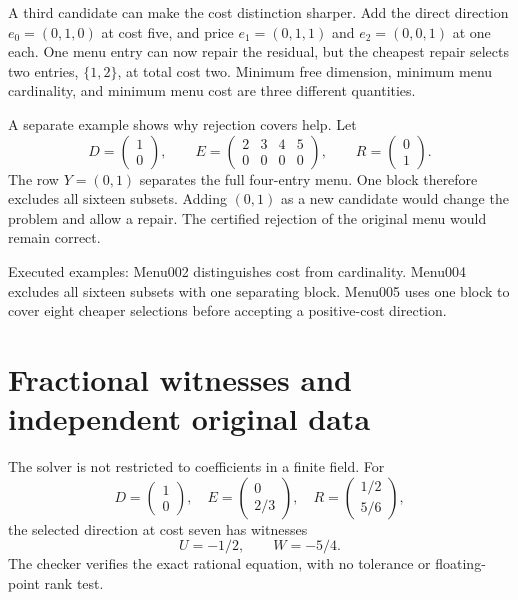 \documentclass[11pt,letterpaper,oneside,openany]{book}
\theoremstyle{quiet}
\newcommand{\sourcescope}[1]{\par\begingroup\small\color{Slate}#1\par\endgroup}
\begin{document}
A third candidate can make the cost distinction sharper. Add the direct direction $e_0=(0,1,0)$ at cost five, and price $e_1=(0,1,1)$ and $e_2=(0,0,1)$ at one each. One menu entry can now repair the residual, but the cheapest repair selects two entries, $\{1,2\}$, at total cost two. Minimum free dimension, minimum menu cardinality, and minimum menu cost are three different quantities.

A separate example shows why rejection covers help. Let
\[
 D=\begin{pmatrix}1\\0\end{pmatrix},\qquad
 E=\begin{pmatrix}2&3&4&5\\0&0&0&0\end{pmatrix},\qquad
 R=\begin{pmatrix}0\\1\end{pmatrix}.
\]
The row $Y=(0,1)$ separates the full four-entry menu. One block therefore excludes all sixteen subsets. Adding $(0,1)$ as a new candidate would change the problem and allow a repair. The certified rejection of the original menu would remain correct.

\sourcescope{Executed examples: Menu002 distinguishes cost from cardinality. Menu004 excludes all sixteen subsets with one separating block. Menu005 uses one block to cover eight cheaper selections before accepting a positive-cost direction.}

\section{Fractional witnesses and independent original data}

The solver is not restricted to coefficients in a finite field. For
\[
 D=\begin{pmatrix}1\\0\end{pmatrix},\quad
 E=\begin{pmatrix}0\\2/3\end{pmatrix},\quad
 R=\begin{pmatrix}1/2\\5/6\end{pmatrix},
\]
the selected direction at cost seven has witnesses
\[
 U=-1/2,\qquad W=-5/4.
\]
The checker verifies the exact rational equation, with no tolerance or floating-point rank test.
\end{document}
